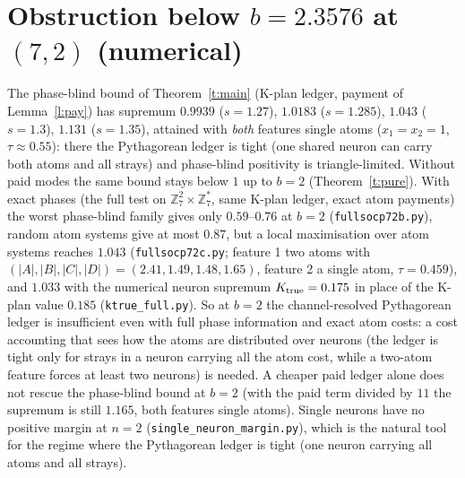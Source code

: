 \documentclass[11pt]{article}
\theoremstyle{remark}\newtheorem{remark}[theorem]{Remark}
\begin{document}
\section*{Obstruction below $b=2.3576$ at $(7,2)$ (numerical)}
The phase-blind bound of Theorem~\ref{t:main} (K-plan ledger, payment of Lemma~\ref{l:pay}) has supremum
$0.9939$ ($s=1.27$), $1.0183$ ($s=1.285$), $1.043$ ($s=1.3$), $1.131$ ($s=1.35$), attained with \emph{both} features single atoms
($x_1=x_2=1$, $\tau\approx0.55$): there the Pythagorean ledger is tight (one shared neuron can carry both atoms and all strays) and
phase-blind positivity is triangle-limited.  Without paid modes the same bound stays below $1$ up to $b=2$ (Theorem~\ref{t:pure}).
With exact phases (the full test on $\mathbb Z_7^2\times\mathbb Z_7^*$, same K-plan ledger, exact atom payments) the worst
phase-blind family gives only $0.59$--$0.76$ at $b=2$ (\texttt{fullsocp72b.py}), random atom systems give at most $0.87$, but a
local maximisation over atom systems reaches $1.043$ (\texttt{fullsocp72c.py}; feature 1 two atoms with
$(|A|,|B|,|C|,|D|)=(2.41,1.49,1.48,1.65)$, feature 2 a single atom, $\tau=0.459$), and $1.033$ with the numerical neuron
supremum $K_{\rm true}=0.175$ in place of the K-plan value $0.185$ (\texttt{ktrue\_full.py}).  So at $b=2$ the channel-resolved
Pythagorean ledger is insufficient even with full phase information and exact atom costs: a cost accounting that sees how the
atoms are distributed over neurons (the ledger is tight only for strays in a neuron carrying all the atom cost, while a two-atom
feature forces at least two neurons) is needed.  A cheaper paid ledger alone does not rescue the phase-blind bound at $b=2$ (with the paid term divided by
$11$ the supremum is still $1.165$, both features single atoms).  Single neurons have no positive margin at $n=2$
(\texttt{single\_neuron\_margin.py}), which is the natural tool for the regime where the Pythagorean ledger is tight (one neuron
carrying all atoms and all strays).
\end{document}
